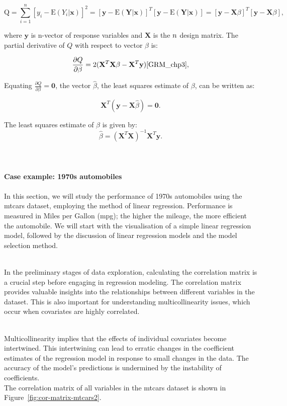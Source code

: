 \documentclass{article}\usepackage[]{graphicx}\usepackage[]{xcolor}
\begin{document}
\begin{equation*}
\mathrm{Q} = \sum_{i=1}^{n} [y_i - \mathrm{E} (Y_i | \mathbf{x})]^2 
           = [\mathbf{y}- \mathrm{E} (\mathbf{Y} | \mathbf{x})]^{T} [\mathbf{y}- \mathrm{E} (\mathbf{Y} | \mathbf{x})] 
           = [\mathbf{y}- \mathbf{X} \beta]^{T} [\mathbf{y}- \mathbf{X} \beta],
\end{equation*}

\noindent
where $\mathbf{y}$ is n-vector of response variables and $\mathbf{X}$ is the $n \time 2$ design matrix. The partial derivative of $Q$ with respect to vector $\beta$ is:

$$\frac{\partial Q}{\partial \beta} = 2(\mathbf{X}^T\mathbf{X}\beta - \mathbf{X}^T\mathbf{y})\cite{GRM_chp3},$$

\noindent
Equating $\frac{\partial Q}{\partial \beta} = \mathbf{0}$, the vector $\hat{\beta}$, the least squares estimate of $\beta$, can be written as:

$$\mathbf{X}^T(\mathbf{y}-\mathbf{X}\hat{\beta})=\mathbf{0}.$$

\noindent 
The least squares estimate of $\beta$ is given by:
$$\hat{\beta} = (\mathbf{X}^T\mathbf{X})^{-1}\mathbf{X}^T\mathbf{y}.$$
\\  
\\  
\noident 
\\\textbf{Case example: 1970s automobiles}\\
\noindent
\\In this section, we will study the performance of 1970s automobiles using the mtcars dataset, employing the method of linear regression. Performance is measured in Miles per Gallon (mpg); the higher the mileage, the more efficient the automobile. We will start with the visualisation of a simple linear regression model, followed by the discussion of linear regression models and the model selection method.

\noindent
\\In the preliminary stages of data exploration, calculating the correlation matrix is a crucial step before engaging in regression modeling. The correlation matrix provides valuable insights into the relationships between different variables in the dataset. This is also important for understanding multicollinearity issues, which occur when covariates are highly correlated.

\noindent
\\Multicollinearity implies that the effects of individual covariates become intertwined. This intertwining can lead to erratic changes in the coefficient estimates of the regression model in response to small changes in the data. The accuracy of the model’s predictions is undermined by the instability of coefficients\cite{multicoli}.
\noindent
\\The correlation matrix of all variables in the mtcars dataset is shown in Figure~\ref{fig:cor-matrix-mtcars2}.
\end{document}
